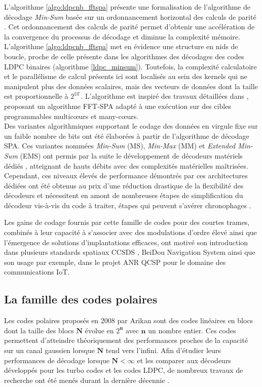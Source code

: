 \documentclass[../main.tex]{subfiles}
\begin{document}
L'algorithme \ref{algo:ldpcnb_fftspa} présente une formalisation de l'algorithme de décodage \textit{Min-Sum} basée sur un ordonnancement horizontal des calculs de parité \cite{NB:FFT:BLG}. Cet ordonnancement des calculs de parité permet d’obtenir une accélération de la convergence du processus de décodage et diminue la complexité mémoire.\\
L'algorithme \ref{algo:ldpcnb_fftspa} met en évidence une structure en nids de boucle, proche de celle présente dans les algorithmes des décodages des codes LDPC binaires (algorithme \ref{ldpc_minsum}). Toutefois, la complexité calculatoire et le parallélisme de calcul présents ici sont localisés au sein des kernels qui ne manipulent plus des données scalaires, mais des vecteurs de données dont la taille est proportionnelle à $2^{\mathbb{GF}}$. 
L'algorithme est inspiré des travaux détaillées dans \cite{NB:FFT:BLG,14,15,16}, proposant un algorithme FFT-SPA adapté à une exécution sur des cibles programmables multicœurs et many-cœurs.\\
Des variantes algorithmiques \cite{17,18,19} supportant le codage des données en virgule fixe sur un faible nombre de bits ont été élaborées à partir de l’algorithme de décodage SPA. Ces variantes nommées \textit{Min-Sum} (MS), \textit{Min-Max} (MM) et \textit{Extended Min-Sum} (EMS) ont permis par la suite le développement de décodeurs matériels dédiés \cite{22,21}, atteignant de hauts débits avec des complexités matérielles maîtrisées. Cependant, ces niveaux élevés de performance démontrés par ces architectures dédiées ont été obtenus au prix d’une réduction drastique de la flexibilité des décodeurs et nécessitent en amont de nombreuses étapes de simplification du décodeur vis-à-vis du code à traiter, étapes qui peuvent s’avérer chronophages \cite{phd_hassan}.

Les gains de codage fournis par cette famille de codes pour des courtes trames, combinés à leur capacité à s’associer avec des modulations d’ordre élevé ainsi que l’émergence de solutions d’implantations efficaces, ont motivé son introduction dans plusieurs standards spatiaux CCSDS \cite{CCSDS:NB}, BeiDou Navigation System \cite{BEIDOU} ainsi que son usage par exemple, dans le projet ANR QCSP \cite{phd_moniere,phd_kassem} pour le domaine des communications IoT.

%
% 
%
% 
% 
\subsection{La famille des codes polaires}
% 
%
%  
% 
Les codes polaires proposés en 2008 par Arikan \cite{Arikan08} sont des codes linéaires en blocs dont la taille des blocs $\bm{N}$ évolue en $2^{\bm{n}}$ avec $\bm{n}$ un nombre entier. Ces codes permettent d’atteindre théoriquement des performances proches de la capacité sur un canal gaussien lorsque $\bm{N}$ tend vers l’infini. 
Afin d’étudier leurs performances de décodage lorsque $\bm N < \infty$ et les comparer aux décodeurs développés pour les turbo codes et les codes LDPC, de nombreux travaux de recherche ont été menés durant la dernière décennie \cite{Golden,phd_seyyed}. 
\end{document}
